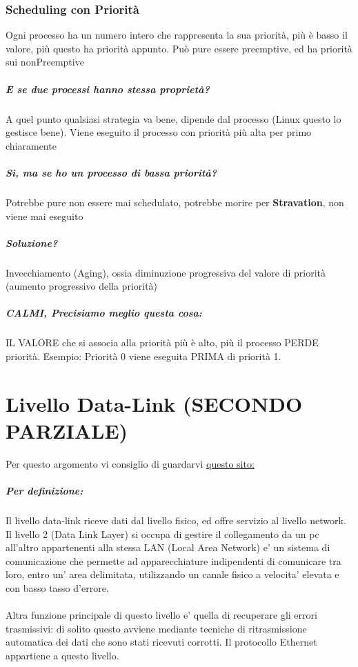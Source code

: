 \documentclass[12pt, a4paper, openany, twoside]{book}
\begin{document}
\subsection{Scheduling con Priorità}
Ogni processo ha un numero intero che rappresenta la sua priorità, più è basso
il valore, più questo ha priorità appunto.
Può pure essere preemptive, ed ha priorità sui nonPreemptive
\paragraph{E se due processi hanno stessa proprietà? }A quel punto qualsiasi
strategia va bene, dipende dal processo (Linux questo lo gestisce bene). 
Viene eseguito il processo con priorità più alta per primo chiaramente
\paragraph{Sì, ma se ho un processo di bassa priorità? }Potrebbe pure non essere 
mai schedulato, potrebbe morire per \textbf{Stravation}, non viene mai eseguito
\paragraph{Soluzione? }Invecchiamento (Aging), ossia diminuzione progressiva
del valore di priorità (aumento progressivo della priorità)  
\paragraph{CALMI, Precisiamo meglio questa cosa: }IL VALORE che si associa alla
priorità più è alto, più il processo PERDE priorità. Esempio: Priorità 0 viene 
eseguita PRIMA di priorità 1.
\chapter{Livello Data-Link (SECONDO PARZIALE)}
Per questo argomento vi consiglio di guardarvi 
\href{https://www.isistassinari.gov.it/progettodicembre/reti/L2.html#f}{questo sito: }
\paragraph{Per definizione: }
Il livello data-link riceve dati dal livello fisico, ed offre servizio al livello
network.
Il livello 2 (Data Link Layer) si occupa di gestire il collegamento da un pc 
all'altro appartenenti alla stessa LAN (Local Area Network) e' un sistema di 
comunicazione che permette ad apparecchiature indipendenti di comunicare tra 
loro, entro un' area delimitata, utilizzando un canale fisico a velocita' 
elevata e con basso tasso d'errore. \\ \\Altra funzione principale di questo livello 
e' quella di recuperare gli errori trasmissivi: di solito questo avviene mediante 
tecniche di ritrasmissione automatica dei dati che sono stati ricevuti corrotti.
Il protocollo Ethernet appartiene a questo livello.
\end{document}
